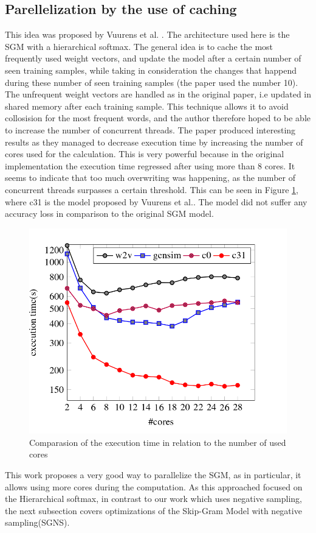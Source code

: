 \subsection{Parellelization by the use of caching}
This idea was proposed by Vuurens et al. \cite{efficient}. The architecture used here is the SGM with a hierarchical softmax. 
The general idea is to cache the most frequently used weight vectors, and update the model after a certain number of seen training samples, while taking in consideration the changes that happend during these number of seen training samples (the paper used the number 10). The unfrequent weight vectors are handled as in the original paper, i.e updated in shared memory after each training sample. This technique  allows it to avoid collosision for the most frequent words, and the author therefore hoped to be able to increase the number of concurrent threads. The paper produced interesting results as they managed to decrease execution time by increasing the number of cores used for the calculation. This is very powerful because in the original implementation the execution time regressed after using more than 8 cores. It seems to indicate that too much overwriting was happening, as the number of concurrent threads surpasses a certain threshold. This can be seen in Figure \ref{fig:efficient}, where c31 is the model proposed by Vuurens et al.\cite{efficient}. The model did not suffer any accuracy loss in comparison to the original SGM model.
\begin{figure}[ht]
\centering
\includegraphics[scale=0.3]{images/cachingEfficiency.png}
\caption{Comparasion of the execution time in relation to the number of used cores \cite{efficient}}
\label{fig:efficient}
\end{figure}
This work proposes a very good way to parallelize the SGM, as in particular, it allows using more cores during the computation. As this approached focused on the Hierarchical softmax, in contrast to our work which uses negative sampling, the next subsection covers optimizations of the Skip-Gram Model with negative sampling(SGNS).


